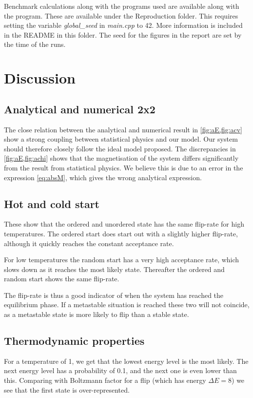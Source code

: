 \documentclass[11pt,a4paper,final]{article}
\numberwithin{equation}{section}
\begin{document}
Benchmark calculations along with the programs used are available 
along with the program. These are available under the Reproduction folder.
This requires setting the variable
\emph{global\_seed} in \emph{main.cpp} to 42. More information is included
in the README in this folder. The seed for the figures in the report are 
set by the time of the runs.

\section{Discussion}

\subsection{Analytical and numerical 2x2}

The close relation between the analytical and numerical result in 
\cref{fig:aE,fig:acv} show a strong coupling between statistical 
physics and our model. Our system should therefore closely follow 
the ideal model proposed. The discrepancies in \cref{fig:aE,fig:achi}
shows that the magnetisation of the system differs significantly 
from the result from statistical physics. We believe this is due to an 
error in the expression \ref{eq:absM}, which gives the wrong analytical 
expression.


\subsection{Hot and cold start}
These show that the ordered and unordered state has the same flip-rate for 
high temperatures. The ordered start does start out with a slightly higher
flip-rate, although it quickly reaches the constant acceptance rate.

For low temperatures the random start has a very high
acceptance rate, which slows down as it reaches the most likely state.
Thereafter the ordered and random start shows the same flip-rate.

The flip-rate is thus a good indicator of when the system has reached the 
equilibrium phase. If a metastable situation is reached these two will 
not coincide, as a metastable state is more likely to flip than a stable
state.

\subsection{Thermodynamic properties}
For a temperature of 1, we get that
the lowest energy level is the most likely. The next energy level has a 
probability of 0.1, and the next one is even lower than this. 
Comparing with Boltzmann factor for a flip (which has energy 
$\Delta E = 8$) we see that the first state is over-represented.
\end{document}
